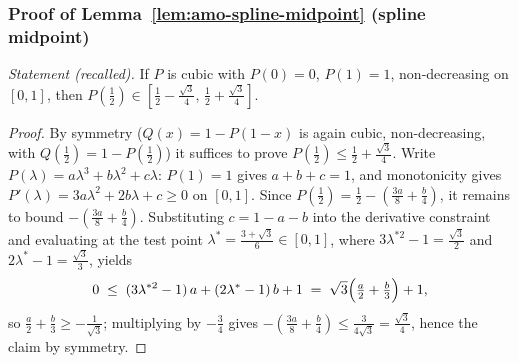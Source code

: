 \subsubsection*{Proof of Lemma~\ref{lem:amo-spline-midpoint} (spline
midpoint)}
{\itshape Statement (recalled).} If $P$ is cubic with $P(0) = 0$, $P(1) = 1$,
non-decreasing on $[0,1]$, then $P(\tfrac12) \in
[\tfrac12 - \tfrac{\sqrt3}{4},\, \tfrac12 + \tfrac{\sqrt3}{4}]$.\eop

\begin{proof}
By symmetry ($Q(x) = 1 - P(1-x)$ is again cubic, non-decreasing, with
$Q(\tfrac12) = 1 - P(\tfrac12)$) it suffices to prove
$P(\tfrac12) \le \tfrac12 + \tfrac{\sqrt{3}}{4}$. Write
$P(\lambda) = a\lambda^{3} + b\lambda^{2} + c\lambda$: $P(1) = 1$ gives
$a + b + c = 1$, and monotonicity gives $P'(\lambda) = 3a\lambda^{2} +
2b\lambda + c \ge 0$ on $[0,1]$. Since $P(\tfrac12) = \tfrac12 -
(\tfrac{3a}{8} + \tfrac{b}{4})$, it remains to bound
$-(\tfrac{3a}{8} + \tfrac{b}{4})$. Substituting $c = 1 - a - b$ into the
derivative constraint and evaluating at the test point $\lambda^{*} =
\tfrac{3+\sqrt{3}}{6} \in [0,1]$, where $3\lambda^{*2} - 1 =
\tfrac{\sqrt{3}}{2}$ and $2\lambda^{*} - 1 = \tfrac{\sqrt{3}}{3}$, yields
\[
0 \;\le\; (3\lambda^{*2} - 1)\,a + (2\lambda^{*} - 1)\,b + 1
\;=\; \sqrt{3}\Bigl(\tfrac{a}{2} + \tfrac{b}{3}\Bigr) + 1,
\]
so $\tfrac{a}{2} + \tfrac{b}{3} \ge -\tfrac{1}{\sqrt{3}}$; multiplying by
$-\tfrac34$ gives $-(\tfrac{3a}{8} + \tfrac{b}{4}) \le
\tfrac{3}{4\sqrt{3}} = \tfrac{\sqrt{3}}{4}$, hence the claim by symmetry.
\end{proof}



